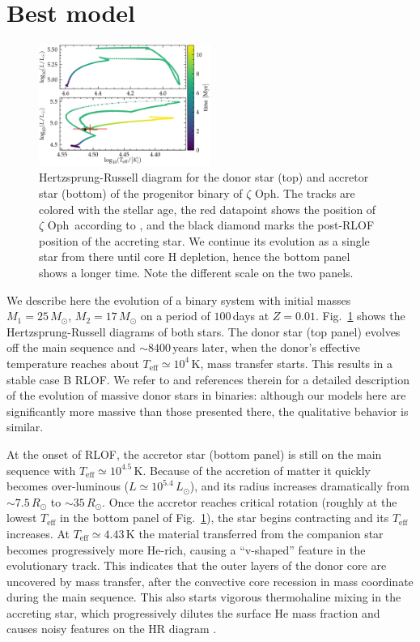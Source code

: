 \documentclass[twocolumn,twocolappendix,trackchanges]{aastex63}
\DeclareRobustCommand{\Figref}[1]{Fig.~\ref{#1}}
\newcommand{\zoph}{$\zeta$ Oph}
\begin{document}
\section{Best model}
\label{sec:best_model}

\begin{figure}[htbp]
  \includegraphics[width=0.5\textwidth]{HRD_both}
  \caption{Hertzsprung-Russell diagram for the donor star (top) and
    accretor star (bottom) of the progenitor binary of \zoph. The
    tracks are colored with the stellar age, the
    red datapoint shows the position of \zoph\ according to
    \cite{villamariz:05}, and the black diamond marks the post-RLOF
    position of the accreting star. We continue its evolution as a single star from
    there until core H depletion, hence the bottom panel shows a longer
    time. Note the different scale on the two panels.}
  \label{fig:HRD_both}
\end{figure}


We describe here the evolution of a binary system with initial masses
$M_1=25\,M_\odot$, $M_2=17\,M_\odot$ on a period of $100$\,days at
$Z=0.01$. \Figref{fig:HRD_both} shows the Hertzsprung-Russell diagrams
of both stars. The donor star (top panel) evolves off the main
sequence and $\sim8400$\,years later, when the donor's effective
temperature reaches about $T_\mathrm{eff}\simeq 10^4$\,K, mass transfer starts. This
results in a stable case B RLOF. We refer to \cite{gotberg:17, laplace:21, blagorodnova:21}
and references therein for a detailed description of the evolution of
massive donor stars in binaries: although our models here are
significantly more massive than those presented there, the qualitative behavior is similar.

At the onset of RLOF, the accretor star (bottom panel) is still on the
main sequence with $T_\mathrm{eff}\simeq10^{4.5}$\,K. Because of the
accretion of matter it quickly becomes over-luminous
($L\simeq10^{5.4}\,L_\odot$), and its radius increases dramatically
from $\sim7.5\,R_\odot$ to $\sim35\,R_\odot$. Once the accretor
reaches critical rotation (roughly at the lowest $T_\mathrm{eff}$ in
the bottom panel of \Figref{fig:HRD_both}), the star begins
contracting and its $T_\mathrm{eff}$ increases. At
$T_\mathrm{eff}\simeq 4.{43}$\,K the material transferred from the
companion star becomes progressively more He-rich, causing a
``v-shaped'' feature in the evolutionary track. This indicates that
the outer layers of the donor core are uncovered by mass transfer,
after the convective core recession in mass coordinate during the main
sequence. This also starts vigorous thermohaline mixing in the
accreting star, which progressively dilutes the surface He mass
fraction and causes noisy features on the HR diagram
\citep[e.g.,][]{cantiello:07}.
\end{document}
